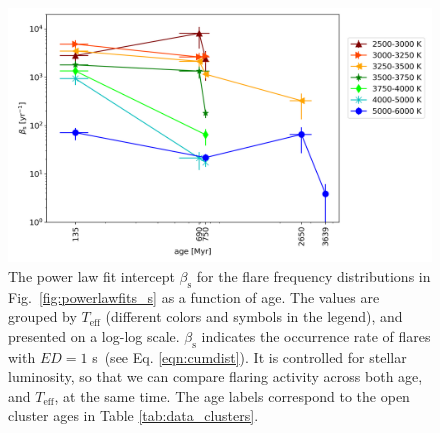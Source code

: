\documentclass{aa}
\begin{document}
\begin{figure}[ht!]
    \centering
    \includegraphics[width=15.5cm]{pics/FFDs/beta_T_age_ED_wheatland.png}
    \caption{The power law fit intercept $\beta_\mathrm{s}$ for the flare frequency distributions in Fig.~\ref{fig:powerlawfits_s} as a function of age. The values are grouped by $T_\mathrm{eff}$ (different colors and symbols in the legend), and presented on a log-log scale. $\beta_\mathrm{s}$ indicates the occurrence rate of flares with $ED=1$ s~(see Eq. \ref{eqn:cumdist}). It is controlled for stellar luminosity, so that we can compare flaring activity across both age, and $T_\mathrm{eff}$, at the same time. The age labels correspond to the open cluster ages in Table \ref{tab:data_clusters}.}    	
    \label{fig:beta_T_age}
\end{figure}
\end{document}

